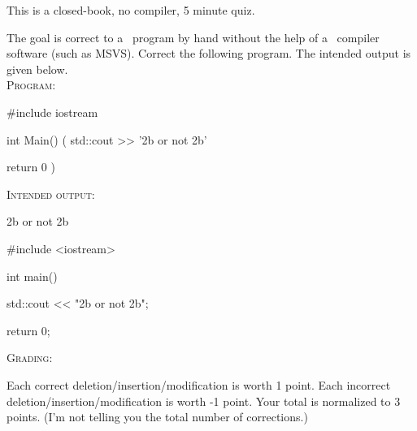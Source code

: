 

This is a closed-book, no compiler, 5 minute quiz.

\nextq
The goal is correct to a \cpp\ program by hand without the help of a \cpp\
compiler software (such as MSVS).
Correct the following program.
The intended output is given below.
\\
\textsc{Program:}
\begin{console}
#include iostream

int Main()
(
    std::cout >> '2b or not 2b'

    return 0
)
\end{console}
\textsc{Intended output:}
\begin{console}
2b or not 2b
\end{console}
\ANSWER
\begin{answercode}
#include <iostream>
  
int main()
{
    std::cout << "2b or not 2b\n";

    return 0;
}
\end{answercode}

\textsc{Grading}:
\begin{tightlist}
\li Each correct deletion/insertion/modification is worth 1 point.
\li Each incorrect deletion/insertion/modification is worth -1 point.
\li Your total is normalized to 3 points.
(I'm not telling you the total number of corrections.)
\end{tightlist}



